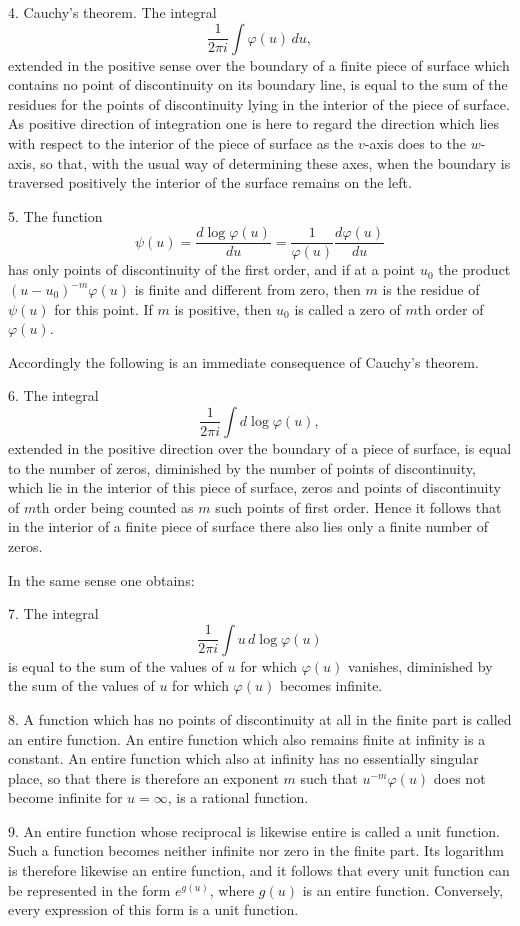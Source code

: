 \documentclass[11pt]{article}
\providecommand{\dd}{\,d}
\begin{document}
4. Cauchy's theorem. The integral
\[
\frac{1}{2\pi i}\int \varphi(u)\dd u,
\]
extended in the positive sense over the boundary of a finite piece of surface which contains no point of discontinuity on its boundary line, is equal to the sum of the residues for the points of discontinuity lying in the interior of the piece of surface. As positive direction of integration one is here to regard the direction which lies with respect to the interior of the piece of surface as the $v$-axis does to the $w$-axis, so that, with the usual way of determining these axes, when the boundary is traversed positively the interior of the surface remains on the left.

5. The function
\[
\psi(u)=\frac{d\log\varphi(u)}{du}=\frac{1}{\varphi(u)}\frac{d\varphi(u)}{du}
\]
has only points of discontinuity of the first order, and if at a point $u_0$ the product $(u-u_0)^{-m}\varphi(u)$ is finite and different from zero, then $m$ is the residue of $\psi(u)$ for this point. If $m$ is positive, then $u_0$ is called a zero of $m$th order of $\varphi(u)$.

Accordingly the following is an immediate consequence of Cauchy's theorem.

6. The integral
\[
\frac{1}{2\pi i}\int d\log\varphi(u),
\]
extended in the positive direction over the boundary of a piece of surface, is equal to the number of zeros, diminished by the number of points of discontinuity, which lie in the interior of this piece of surface, zeros and points of discontinuity of $m$th order being counted as $m$ such points of first order. Hence it follows that in the interior of a finite piece of surface there also lies only a finite number of zeros.

In the same sense one obtains:

7. The integral
\[
\frac{1}{2\pi i}\int u\,d\log\varphi(u)
\]
is equal to the sum of the values of $u$ for which $\varphi(u)$ vanishes, diminished by the sum of the values of $u$ for which $\varphi(u)$ becomes infinite.

8. A function which has no points of discontinuity at all in the finite part is called an entire function. An entire function which also remains finite at infinity is a constant. An entire function which also at infinity has no essentially singular place, so that there is therefore an exponent $m$ such that $u^{-m}\varphi(u)$ does not become infinite for $u=\infty$, is a rational function.

9. An entire function whose reciprocal is likewise entire is called a unit function. Such a function becomes neither infinite nor zero in the finite part. Its logarithm is therefore likewise an entire function, and it follows that every unit function can be represented in the form $e^{g(u)}$, where $g(u)$ is an entire function. Conversely, every expression of this form is a unit function.
\end{document}
